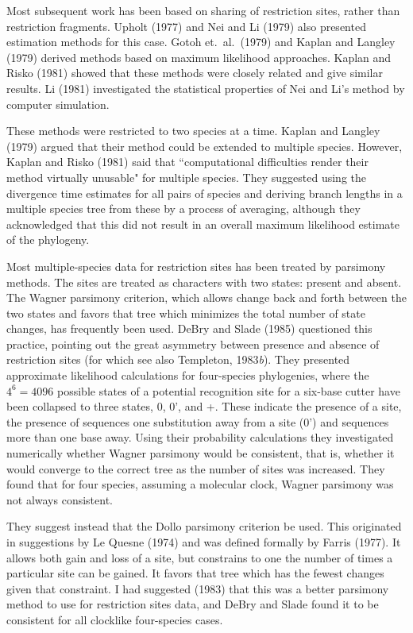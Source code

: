 Most subsequent work has been based on sharing of restriction sites, rather
than restriction fragments.  Upholt (1977) and Nei and Li (1979) also
presented estimation
methods for this case.  Gotoh et.~al.~(1979) and Kaplan and Langley (1979)
derived methods based on maximum likelihood approaches.  Kaplan and Risko
(1981) showed that these methods were closely related and give similar
results.  Li (1981) investigated the statistical properties of Nei and Li's
method by computer simulation.

These methods were restricted to two species at a time.  Kaplan and Langley
(1979) argued that their method could be extended to multiple species.
However, Kaplan and Risko (1981) said that ``computational difficulties render
their method virtually unusable" for multiple species.  They suggested using the
divergence time estimates for all pairs of species and deriving branch
lengths in a multiple species tree from these by a process of averaging,
although they acknowledged that this did not result in an overall maximum
likelihood estimate of the phylogeny.

Most multiple-species data for restriction sites has been treated by
parsimony methods.  The sites are treated as characters with two states:
present and absent.  The Wagner parsimony criterion, which allows
change back and forth between the two states and favors that tree which
minimizes the total number of state changes, has frequently been used.
DeBry and Slade (1985) questioned
this practice, pointing out the great asymmetry between presence and absence
of restriction sites (for which see also Templeton, 1983{\it b}).  They presented
approximate likelihood calculations
for four-species phylogenies, where the $4^6 = 4096$ possible states of a
potential recognition site for a six-base cutter have been collapsed to
three states, 0, 0', and +.  These indicate the presence of a site, the
presence of sequences one substitution away from a site (0') and sequences
more than one base away.  Using their probability calculations they
investigated numerically whether Wagner parsimony would be consistent, that
is, whether it would converge to the correct tree as the number of sites was
increased.  They found that for four species, assuming a molecular clock,
Wagner parsimony was not always consistent.

They suggest instead that the Dollo parsimony criterion be used.  This
originated in suggestions by Le Quesne (1974) and was defined formally by
Farris (1977).  It allows both gain and loss of a site, but constrains to one
the number of times a particular site can be gained.  It favors that tree
which has the fewest changes given that constraint.  I had suggested
(1983) that this was a better parsimony method to use for restriction sites
data, and DeBry and Slade found it to be consistent for all clocklike
four-species cases.

